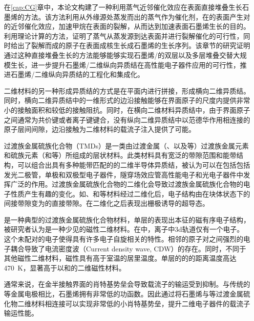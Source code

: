 在\ref{cap:CG}章中，本论文构建了一种利用蒸气近邻催化效应在表面直接堆叠生长石墨烯的方法。该方法利用从外缘源处蒸发而出的蒸气作为催化剂，在的表面产生对的近邻催化效应，加速甲烷在表面的裂解，从而达到加速表面石墨烯生长的目的。利用理论计算的方法，证明了蒸气从蒸发源到达表面并进行裂解催化的可行性，同时给出了裂解而成的原子在表面成核生长成石墨烯的生长序列。该章节的研究证明通过这种直接堆叠生长的方法能够能够实现石墨烯/的双层以及多层堆叠交替大规模生长，进一步提升石墨烯/二维纵向异质结在高性能电子器件应用的可行性，推进石墨烯/二维纵向异质结的工程化和集成化。

二维材料的另一种形成异质结的方式是在平面内进行拼接，形成横向二维异质结。同时，横向二维异质结中的一维形式的边沿接触能够在界面原子的尺度内提供非常小的接触面积和较低的接触阻抗。同时，在横向二维材料异质结中，由于界面原子之间通常为共价键或者离子键键合，没有纵向二维异质结中以范德华作用相连接的原子层间间隙，边沿接触为二维材料的载流子注入提供了可能。

过渡族金属硫族化合物（TMDs）是一类由过渡金属（、以及等）过渡族金属元素和硫族元素（和等）所组成的层状材料。此类材料具有宽泛的带隙范围和能带结构，可以组合出具有多种能带匹配的的二维半导体异质结，被认为可以在包括包括发光二极管，单极和双极型电子器件，隧穿场效应管高性能电子和光电子器件中发挥广泛的作用。过渡族金属硫族化合物的二维化会导致过渡族金属硫族化合物的电子性质产生有趣的变化。如、和等材料经过二维化后，电子结构由在块体状态下的间接带隙变为的直接带隙。在二维化之后表现出栅极诱导的超导态。

是一种典型的过渡族金属硫族化合物材料，单层的表现出本征的磁有序电子结构，被研究者认为是一种少见的磁性二维材料。在中，离子中3d轨道仅有一个电子。这个未配对的电子使得具有许多电子自旋相关的特性。相邻的原子对之间强烈的电子耦合导致了电流密度波（Current density wave, CDW）的存在。同时，不同于其他磁性二维材料，磁性具有高于室温的居里温度。单层的的的距离温度高达\SI{470}{\kelvin}，显著高于以和的二维磁性材料。

通常来说，在金半接触界面的肖特基势垒会导致载流子的输运受到抑制。与传统的等金属电极相比，石墨烯拥有非常低的功函数。因此通过将石墨烯与等过渡金属硫化物二维材料相连接可以实现非常低的小肖特基势垒，提升二维电子器件的载流子输运性能。

